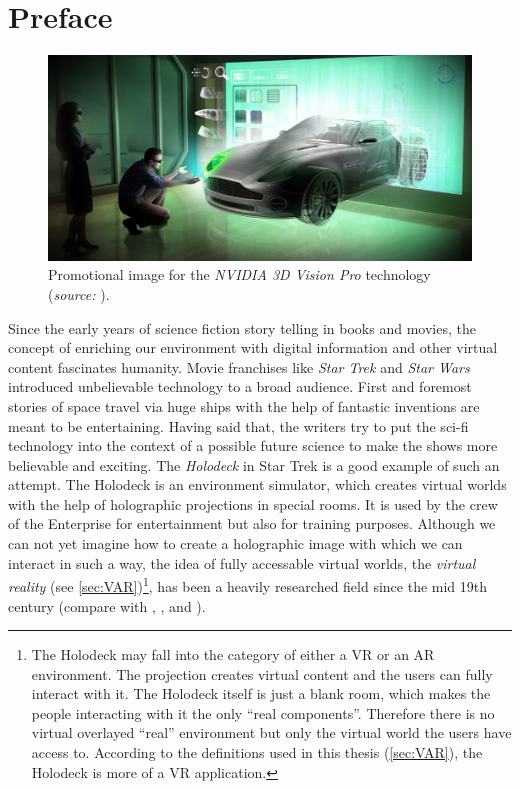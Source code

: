 \section{Preface} \label{sec:preface}

\begin{figure}[htbp]
		\centering
		\includegraphics[width=1.0\textwidth]{figures/nvidia-3d-vision-pro}
		\caption[Promotional image for the NVIDIA 3D Vision Pro technology]{Promotional image for the \textit{NVIDIA 3D Vision Pro} technology (\textit{source:} \cite{Gizmag.2010}).}
		\label{fig:3dVisionary}
\end{figure}

Since the early years of science fiction story telling in books and movies, the concept of enriching our environment with digital information and other virtual content fascinates humanity. Movie franchises like \textit{Star Trek} and \textit{Star Wars} introduced unbelievable technology to a broad audience. First and foremost stories of space travel via huge ships with the help of fantastic inventions are meant to be entertaining. Having said that, the writers try to put the sci-fi technology into the context of a possible future science to make the shows more believable and exciting. The \textit{Holodeck} in Star Trek is a good example of such an attempt. The Holodeck is an  environment simulator, which creates virtual worlds with the help of holographic projections in special rooms. It is used by the crew of the Enterprise for entertainment but also for training purposes. Although we can not yet imagine how to create a holographic image with which we can interact in such a way, the idea of fully accessable virtual worlds, the \textit{virtual reality} (see \autoref{sec:VAR})\footnote{The Holodeck may fall into the category of either a VR or an AR environment. The projection creates virtual content and the users can fully interact with it. The Holodeck itself is just a blank room, which makes the people interacting with it the only \enquote{real components}. Therefore there is no virtual overlayed \enquote{real} environment but only the virtual world the users have access to. According to the definitions used in this thesis (\autoref{sec:VAR}), the Holodeck is more of a VR application.}, has been a heavily researched field since the mid 19th century (compare with \cite{Nasa.2009}, \cite[p.3]{Toennis.2010}, \cite[p.19 et seq.]{Doerner.2013} and \cite[p.4 et seq.]{Burdea.2003}).

